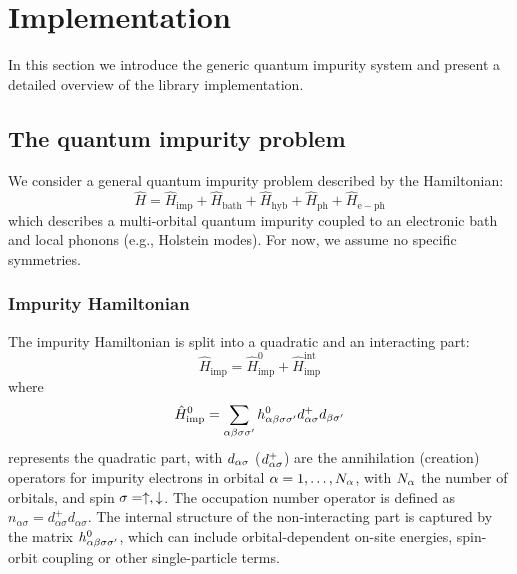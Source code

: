 \documentclass[edipack2.tex]{subfiles}
\begin{document}
\section{Implementation}\label{SecEDIpack}
In this section we introduce the generic quantum impurity system and
present a detailed overview of the \NAME library implementation. 













\subsection{The quantum impurity problem}\label{sSecQIM}
We consider a general quantum impurity problem described by the Hamiltonian:
$$
\hat{H} = \hat{H}_\mathrm{imp} + \hat{H}_\mathrm{bath} + \hat{H}_\mathrm{hyb} + \hat{H}_\mathrm{ph} + \hat{H}_\mathrm{e-ph}
$$
which describes a multi-orbital quantum impurity
coupled to an electronic bath and local phonons (e.g., Holstein
modes). For now, we assume no specific symmetries.

\subsubsection{Impurity Hamiltonian}
The impurity Hamiltonian is split into a quadratic and an 
interacting part:
\begin{equation}\label{Himp}
  \hat{H}_\mathrm{imp}  = \hat{H}^0_\mathrm{imp} + \hat{H}^\mathrm{int}_\mathrm{imp}
\end{equation}
where
\begin{equation}\label{H0imp}
  \hat{H}^0_\mathrm{imp}  =
  \sum_{\alpha\beta\sigma\sigma'}h^{0}_{\alpha\beta\sigma\sigma'}d^{+}_{\alpha\sigma}d_{\beta\sigma'}
\end{equation}
represents the quadratic part, with $d_{\alpha\sigma}$ ($d^+_{\alpha\sigma}$) are the annihilation (creation)
operators for impurity electrons in 
orbital $\alpha=1,\dots,N_\alpha$, with $N_\alpha$ the number of orbitals,
and spin $\sigma=\uparrow,\downarrow$.  The occupation number operator is defined
as  $n_{\alpha\sigma}=d^{+}_{\alpha\sigma}d_{\alpha\sigma}$.
The internal structure of the non-interacting part is captured by the 
matrix $h^{0}_{\alpha\beta\sigma\sigma'}$, which can include 
orbital-dependent on-site energies, spin-orbit coupling or other 
single-particle terms.
\end{document}
